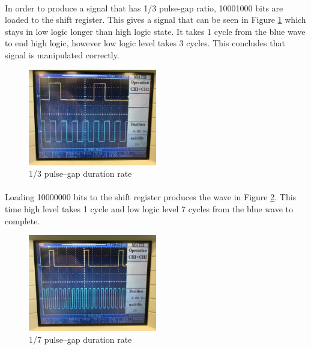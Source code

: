 \documentclass[pdftex,12pt,a4paper]{article}
\begin{document}
\begin{flushleft}
\paragraph{}
In order to produce a signal that has 1/3 pulse-gap ratio, 10001000 bits are loaded to the shift register. This gives a signal that can be seen in Figure \ref{fig:1over3pulsegap} which 
stays in low logic longer than high logic state. It takes 1 cycle from the blue wave to end high logic, however low logic level takes 3 cycles. This concludes that signal is manipulated correctly.
\begin{figure}[h]
	\centering
	\includegraphics[width=0.5\textwidth]{1over3pulsegap.jpg}	
	\caption{1/3 pulse–gap duration rate}
	\label{fig:1over3pulsegap}
\end{figure}

\paragraph{}
Loading 10000000 bits to the shift register produces the wave in Figure \ref{fig:1over7pulsegap}. This time high level takes 1 cycle and low logic level 7 cycles from the blue wave to complete.
\begin{figure}[h]
	\centering
	\includegraphics[width=0.5\textwidth]{1over7pulsegap.jpg}	
	\caption{1/7 pulse–gap duration rate}
	\label{fig:1over7pulsegap}
\end{figure}


\end{flushleft}
\end{document}
